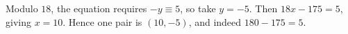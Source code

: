 Modulo $18$, the equation requires $-y\equiv5$, so take $y=-5$. Then $18x-175=5$, giving $x=10$. Hence one pair is $\boxed{(10,-5)}$, and indeed $180-175=5$.
